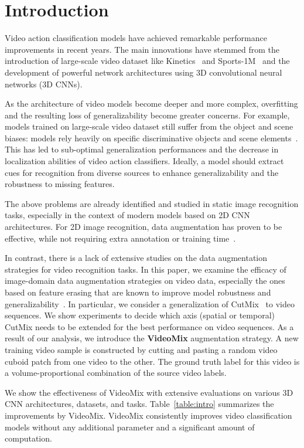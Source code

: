 \section{Introduction}
\label{section:introduction}
Video action classification models have achieved remarkable performance improvements in recent years. 
The main innovations have stemmed from the introduction of large-scale video dataset like Kinetics~\cite{kinetics} and Sports-1M~\cite{KarpathyCVPR14} and the development of powerful network architectures using 3D convolutional neural networks (3D CNNs). 

As the architecture of video models become deeper and more complex, overfitting and the resulting loss of generalizability become greater concerns. For example, models trained on large-scale video dataset still suffer from the object and scene biases: models rely heavily on specific discriminative objects and scene elements~\cite{sevilla2019only,li2019repair,weinzaepfel2019mimetics}. This has led to sub-optimal generalization performances and the decrease in localization abilities of video action classifiers. Ideally, a model should extract cues for recognition from diverse sources to enhance generalizability and the robustness to missing features.

The above problems are already identified and studied in static image recognition tasks, especially in the context of modern models based on 2D CNN architectures. For 2D image recognition, data augmentation has proven to be effective, while not requiring extra annotation or training time~\cite{singh2017hide,choe2019attention,cutmix}.

In contrast, there is a lack of extensive studies on the data augmentation strategies for video recognition tasks. In this paper, we examine the efficacy of image-domain data augmentation strategies on video data, especially the ones based on feature erasing that are known to improve model robustness and generalizability~\cite{devries2017cutout,zhong2017randomerase}.
In particular, we consider a generalization of CutMix~\cite{cutmix} to video sequences.
We show experiments to decide which axis (spatial or temporal) CutMix needs to be extended for the best performance on video sequences. 
As a result of our analysis, we introduce the \textbf{VideoMix} augmentation strategy. A new training video sample is constructed by cutting and pasting a random video cuboid patch from one video to the other. The ground truth label for this video is a volume-proportional combination of the source video labels.




We show the effectiveness of VideoMix with extensive evaluations on various 3D CNN architectures, datasets, and tasks.
Table~\ref{table:intro} summarizes the improvements by VideoMix.
VideoMix consistently improves video classification models without any additional parameter and a significant amount of computation.
